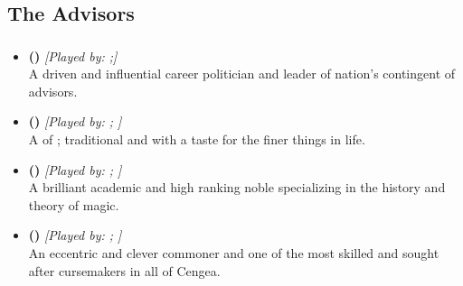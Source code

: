 \documentclass[blue]{GL2020}
\begin{document}
\name{\bDramatisPersonae{}}

\subsection*{The Advisors}
\subsubsection*{\pFarm{}}
\begin{itemize}
	\item \textbf{\cEvil{\full} (\cEvil{\MYCharpronouns})} \textit{[Played by: \cEvil{\MYplayer};\cEvil{\MYPlaypronouns}]}\\  A driven and influential career politician and leader of \cEvil{\their} nation's contingent of advisors.
	
	\item \textbf{\cHedonist{\full} (\cHedonist{\MYCharpronouns})} \textit{[Played by: \cHedonist{\MYplayer}; \cHedonist{\MYPlaypronouns}]}\\  A \cHedonist{\cleric} of \cFarmGod{}; traditional and with a taste for the finer things in life.
	
	\item \textbf{\cWildCard{\full} (\cWildCard{\MYCharpronouns})} \textit{[Played by: \cWildCard{\MYplayer}; \cWildCard{\MYPlaypronouns}]}\\  A brilliant academic and high ranking noble specializing in the history and theory of magic.
	 
	\item \textbf{\cCurse{\full} (\cCurse{\MYCharpronouns})} \textit{[Played by: \cCurse{\MYplayer}; \cCurse{\MYPlaypronouns}]}\\ An eccentric and clever commoner and one of the most skilled and sought after cursemakers in all of Cengea.
\end{itemize}
\end{document}
